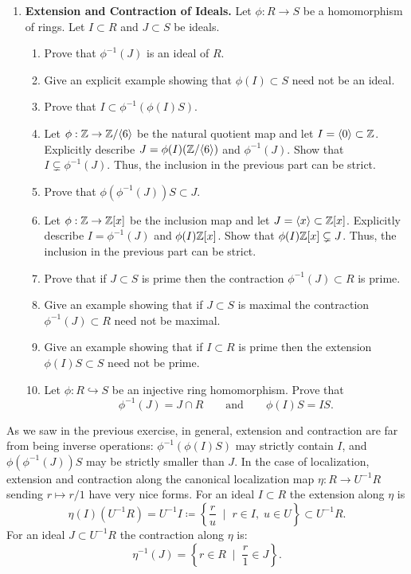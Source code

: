 \documentclass[12pt,reqno]{amsart}
\begin{document}
\begin{enumerate}[leftmargin=*,resume]

\item \textbf{Extension and Contraction of Ideals.} Let $\phi:R \to S$ be a homomorphism of rings. Let $I \subset R$ and $J \subset S$ be ideals.
\begin{enumerate}
	\item Prove that $\phi^{-1}(J)$ is an ideal of $R$. 
	\item Give an explicit example showing that $\phi(I) \subset S$ need not be an ideal. 
	\item Prove that $I \subset \phi^{-1}(\phi(I)S)$.
	\item Let $\phi:\mathbb{Z} \to \mathbb{Z}/\langle 6\rangle$ be the natural quotient map and let $I=\langle 0\rangle \subset \mathbb{Z}$. Explicitly describe $J=\phi(I)(\mathbb{Z}/\langle 6\rangle)$ and $\phi^{-1}(J)$.  Show that $I \subsetneq \phi^{-1}(J)$. Thus, the inclusion in the previous part can be strict.
	\item Prove that $\phi(\phi^{-1}(J))S \subset J$.
	\item Let $\phi:\mathbb{Z}\to \mathbb{Z}[x]$ be the inclusion map and let $J=\langle x\rangle \subset \mathbb{Z}[x]$. Explicitly describe $I=\phi^{-1}(J)$ and $\phi(I)\mathbb{Z}[x]$. Show that $\phi(I)\mathbb{Z}[x] \subsetneq J$. Thus, the inclusion in the previous part can be strict.
	\item Prove that if $J \subset S$ is prime then the contraction $\phi^{-1}(J) \subset R$ is prime. 
	\item Give an example showing that if $J \subset S$ is maximal the contraction $\phi^{-1}(J) \subset R$ need not be maximal.
	\item Give an example showing that if $I \subset R$ is prime then the extension $\phi(I)S \subset S$ need not be prime. 
	\item Let $\phi:R \hookrightarrow S$ be an injective ring homomorphism. Prove that 
	\[
	\phi^{-1}(J)=J\cap R \quad \quad \text{and} \quad \quad \phi(I)S = IS.
	\]
\end{enumerate}
\end{enumerate}

\hrulefill

 As we saw in the previous exercise, in general, extension and contraction are far from being inverse operations: $\phi^{-1}(\phi(I)S)$ may strictly contain $I$, and $\phi(\phi^{-1}(J))S$ may be strictly smaller than $J$. In the case of localization, extension and contraction along the canonical localization map $\eta:R\to U^{-1}R$ sending $r\mapsto r/1$ have very nice forms. For an ideal $I \subset R$ the extension along $\eta$ is
 \[
\eta(I)\left(U^{-1}R\right)= U^{-1}I\coloneqq \left\{\frac{r}{u}\;\; \big|\;\; r\in I,\; u\in U\right\}\subset U^{-1}R.
\]
For an ideal $J \subset U^{-1}R$ the contraction along $\eta$ is:
\[
\eta^{-1}(J) = \left\{r\in R\;\; \big|\;\; \frac{r}{1} \in J\right\}.
\]
\end{document}
